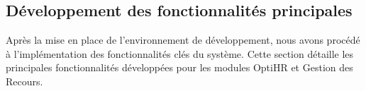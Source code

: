 \subsection{Développement des fonctionnalités principales}

Après la mise en place de l'environnement de développement, nous avons procédé à l'implémentation des fonctionnalités clés du système. Cette section détaille les principales fonctionnalités développées pour les modules OptiHR et Gestion des Recours.




